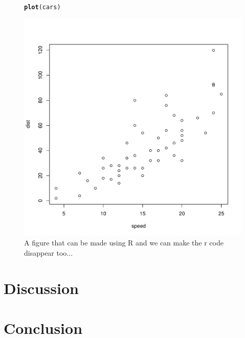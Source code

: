 \documentclass{article}\usepackage[]{graphicx}\usepackage[]{color}
\makeatletter
\def\maxwidth{ %
  \ifdim\Gin@nat@width>\linewidth
    \linewidth
  \else
    \Gin@nat@width
  \fi
}
\newcommand{\hlstd}[1]{\textcolor[rgb]{0.345,0.345,0.345}{#1}}%
\newcommand{\hlkwd}[1]{\textcolor[rgb]{0.737,0.353,0.396}{\textbf{#1}}}%
\newenvironment{kframe}{%
 \def\at@end@of@kframe{}%
 \ifinner\ifhmode%
  \def\at@end@of@kframe{\end{minipage}}%
  \begin{minipage}{\columnwidth}%
 \fi\fi%
 \def\FrameCommand##1{\hskip\@totalleftmargin \hskip-\fboxsep
 \colorbox{shadecolor}{##1}\hskip-\fboxsep
     \hskip-\linewidth \hskip-\@totalleftmargin \hskip\columnwidth}%
 \MakeFramed {\advance\hsize-\width
   \@totalleftmargin\z@ \linewidth\hsize
   \@setminipage}}%
 {\par\unskip\endMakeFramed%
 \at@end@of@kframe}
\newenvironment{knitrout}{}{} %
\makeatother
\begin{document}
\begin{figure}
\begin{knitrout}
\color{fgcolor}\begin{kframe}
\begin{alltt}
\hlkwd{plot}\hlstd{(cars)}
\end{alltt}
\end{kframe}
\includegraphics[width=\maxwidth]{figure/unnamed-chunk-1-1} 

\end{knitrout}
\caption{A figure that can be made using R and we can make the r code disappear too...}
\label{fig:carsplot}
\end{figure}

\section{Discussion}

\section{Conclusion}



\end{document}
